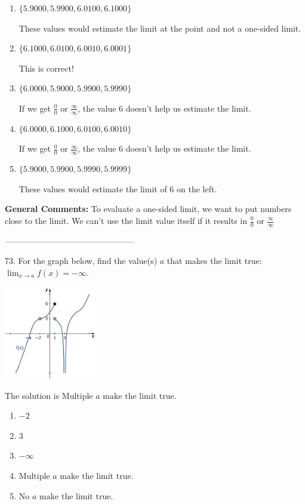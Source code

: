 \documentclass{extbook}[14pt]
\begin{document}
\begin{enumerate}[label=\Alph*.] 
\item $ \{ 5.9000, 5.9900, 6.0100, 6.1000 \} $ 

 These values would estimate the limit at the point and not a one-sided limit. 
\item $ \{ 6.1000, 6.0100, 6.0010, 6.0001 \} $ 

 This is correct! 
\item $ \{ 6.0000, 5.9000, 5.9900, 5.9990 \} $ 

 If we get $\frac{0}{0}$ or $\frac{\infty}{\infty}$, the value 6 doesn't help us estimate the limit. 
\item $ \{ 6.0000, 6.1000, 6.0100, 6.0010 \} $ 

 If we get $\frac{0}{0}$ or $\frac{\infty}{\infty}$, the value 6 doesn't help us estimate the limit. 
\item $ \{ 5.9000, 5.9900, 5.9990, 5.9999 \} $ 

 These values would estimate the limit of 6 on the left. 
\end{enumerate} 
 
\textbf{General Comments:} To evaluate a one-sided limit, we want to put numbers close to the limit. We can't use the limit value itself if it results in $\frac{0}{0}$ or $\frac{\infty}{\infty}$

-----------------------------------------------

73. For the graph below, find the value(s) $a$ that makes the limit true: $ \displaystyle \lim_{x \rightarrow a} f(x) = -\infty$.
\begin{center} \includegraphics[width=0.3\textwidth]{../Figures/evaluateLimitGraphicallyB.png} \end{center} 

The solution is $ \text{Multiple } a \text{ make the limit true}. $ 

\begin{enumerate}[label=\Alph*.] 
\item $ -2 $ 

  
\item $ 3 $ 

  
\item $ -\infty $ 

  
\item $ \text{Multiple } a \text{ make the limit true}. $ 

  
\item $ \text{No } a \text{ make the limit true}. $ 

  
\end{enumerate} 
 
\end{document}
